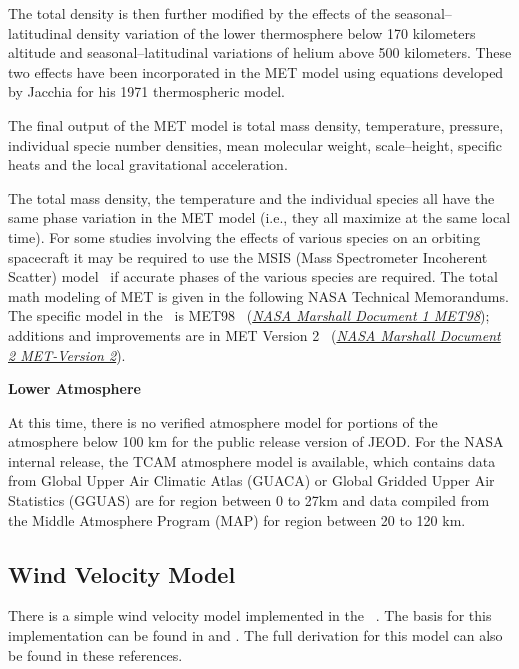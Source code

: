 The total density is then further modified by the effects of the
seasonal--latitudinal density variation of the lower thermosphere below 170
kilometers altitude and seasonal--latitudinal variations of helium above 500
kilometers.  These two effects have been incorporated in the MET model using
equations developed by Jacchia for his 1971 thermospheric model.

The final output of the MET model is total mass density, temperature,
pressure, individual specie number densities, mean molecular weight,
scale--height, specific heats and the local gravitational acceleration.

The total mass density, the temperature and the individual species all have
the same phase variation in the MET model (i.e., they all maximize at the
same local time).  For some studies involving the effects of various species
on an orbiting spacecraft it may be required to use the MSIS (Mass
Spectrometer Incoherent Scatter) model~\cite{Hedin} if accurate phases of
the various species are required.  The total math modeling of MET is given
in the following NASA Technical Memorandums.  The specific model in the
\atmosphereDesc\
is MET98~\cite{Hickey}
(\href{file:\JEODHOME/models/environment/atmosphere/docs/refs/met98.pdf}
{\em NASA Marshall Document 1 MET98});
additions and improvements are in MET Version 2~\cite{Owens}
(\href{file:\JEODHOME/models/environment/atmosphere/docs/refs/marshallMETTM.pdf}
{\em NASA Marshall Document 2 MET-Version 2}).

\textbf{Lower Atmosphere}

At this time, there is no verified atmosphere model for portions of the
atmosphere below 100 km for the public release version of JEOD. For the NASA
internal release, the TCAM atmosphere model is available, which contains data from
Global Upper Air Climatic Atlas (GUACA) or Global Gridded Upper Air Statistics
(GGUAS) are for region between 0 to 27km and data compiled from the Middle
Atmosphere Program (MAP) for region between 20 to 120 km.

\subsection{Wind Velocity Model}

There is a simple wind velocity model implemented in the \JEODid\ \atmosphereDesc.
The basis for this implementation can be found in \cite{Zarrouati} and \cite{King}.
The full derivation for this model can also be found in these references.

